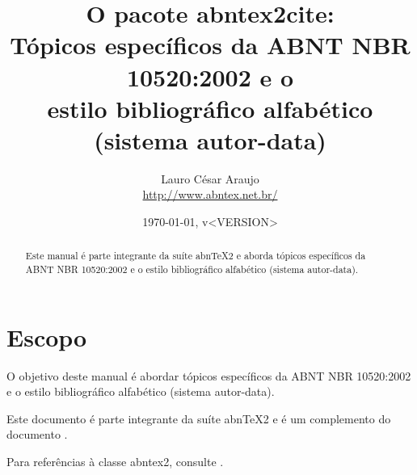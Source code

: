 \documentclass[a4paper]{ltxdoc}
\begin{document}
\nocite{santos1994}
\nocite{secretaria1999} %
\nocite{redes1995}
\nocite{makau1962} %

\newcommand{\titulo}{\textbf{O pacote \textsf{abntex2cite}}:\\ \Large{Tópicos
específicos da ABNT NBR 10520:2002 e o \\ estilo bibliográfico alfabético
(sistema autor-data)}}

\newcommand{\abnTeX}{abn\TeX}
\newcommand{\abnTeXSite}{\url{http://www.abntex.net.br/}}
\newcommand{\optiondefaultval}[1]{\underline{\texttt{#1}}}

\title{\titulo}
\author{
Lauro César Araujo\\\abnTeXSite}
\date{\today, v<VERSION>}

\maketitle


\begin{abstract}
Este manual é parte integrante da suíte \abnTeX2 e aborda tópicos específicos
da ABNT NBR 10520:2002 e o estilo bibliográfico alfabético (sistema
autor-data).
\end{abstract}


\tableofcontents

\listoftables

\section{Escopo}

O objetivo deste manual é abordar tópicos específicos da ABNT NBR 10520:2002 e
o estilo bibliográfico alfabético (sistema autor-data).

Este documento é parte integrante da suíte \abnTeX2 e é um complemento do
documento .

Para referências à classe \textsf{abntex2}, consulte .
\end{document}
